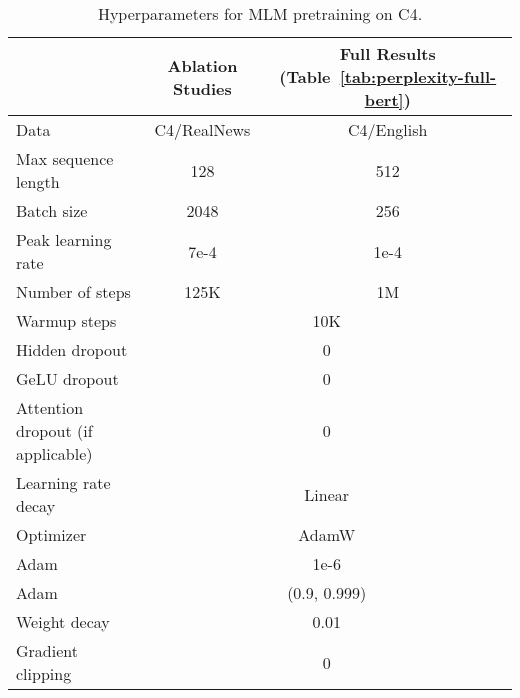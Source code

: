 \documentclass{article}
\begin{document}
\begin{table}[t]
\centering
\begin{tabular}{@{}l|c|c@{}}
\toprule
 & Ablation Studies & Full Results (Table~\ref{tab:perplexity-full-bert}) \\ \midrule
Data & C4/RealNews & C4/English \\
Max sequence length & 128 & 512 \\
Batch size & 2048 & 256 \\
Peak learning rate & 7e-4 & 1e-4 \\
Number of steps & 125K & 1M \\
\midrule
Warmup steps & \multicolumn{2}{c}{10K} \\
Hidden dropout & \multicolumn{2}{c}{0} \\
GeLU dropout & \multicolumn{2}{c}{0} \\
Attention dropout (if applicable) & \multicolumn{2}{c}{0} \\
Learning rate decay & \multicolumn{2}{c}{Linear} \\
Optimizer & \multicolumn{2}{c}{AdamW} \\
Adam  & \multicolumn{2}{c}{1e-6} \\
Adam  & \multicolumn{2}{c}{(0.9, 0.999)} \\
Weight decay & \multicolumn{2}{c}{0.01} \\ 
Gradient clipping & \multicolumn{2}{c}{0} \\
\bottomrule
\end{tabular}
\caption{Hyperparameters for MLM pretraining on C4.}
\end{table}
\end{document}
